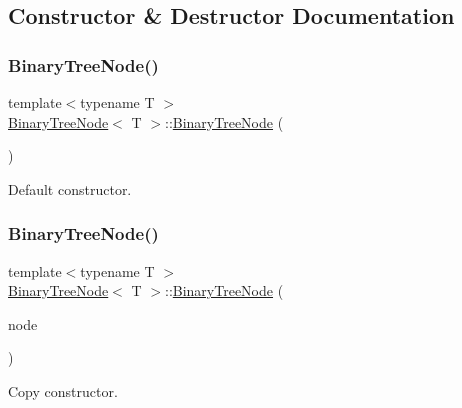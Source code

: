 \subsection{Constructor \& Destructor Documentation}
\mbox{\label{classBinaryTreeNode_aa7a20e203a1e6aa2cf59be86bd493f08}} 
\subsubsection{\texorpdfstring{Binary\+Tree\+Node()}{BinaryTreeNode()}\hspace{0.1cm}{\footnotesize\ttfamily [1/3]}}
{\footnotesize\ttfamily template$<$typename T $>$ \\
\hyperlink{classBinaryTreeNode}{Binary\+Tree\+Node}$<$ T $>$\+::\hyperlink{classBinaryTreeNode}{Binary\+Tree\+Node} (\begin{DoxyParamCaption}{ }\end{DoxyParamCaption})}

Default constructor. \mbox{\label{classBinaryTreeNode_a44089b64b058a805e5f17d9518317f38}} 
\subsubsection{\texorpdfstring{Binary\+Tree\+Node()}{BinaryTreeNode()}\hspace{0.1cm}{\footnotesize\ttfamily [2/3]}}
{\footnotesize\ttfamily template$<$typename T $>$ \\
\hyperlink{classBinaryTreeNode}{Binary\+Tree\+Node}$<$ T $>$\+::\hyperlink{classBinaryTreeNode}{Binary\+Tree\+Node} (\begin{DoxyParamCaption}\item[{const \hyperlink{classBinaryTreeNode}{Binary\+Tree\+Node}$<$ T $>$ \&}]{node }\end{DoxyParamCaption})}

Copy constructor. \mbox{\label{classBinaryTreeNode_adc784168efc0f866e0c5eb368cfec60e}} 
